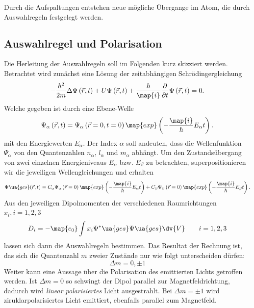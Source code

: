 Durch die Aufspaltungen entstehen neue mögliche Übergange im Atom, die durch Auswahlregeln festgelegt werden.

\subsection{Auswahlregel und Polarisation}
Die Herleitung der Auswahlregeln soll im Folgenden kurz skizziert werden.
Betrachtet wird zunächst eine Lösung der zeitabhängigen Schrödingergleichung
\begin{equation}
  \label{eq:s_gleichung}
  -\frac{\hbar^2}{2m}\Delta \Psi\left(\vec{r},t\right) + U  \Psi\left(\vec{r},t\right) + \frac{\hbar}{\map{i}} \frac{\partial}{\partial t}  \Psi\left(\vec{r},t\right)=0.
\end{equation}
Welche gegeben ist durch eine Ebene-Welle
\begin{equation*}
  \Psi_{\alpha}\left(\vec{r},t\right)=\Psi_{\alpha}\left(\vec{r}=0,t=0\right)\map{exp}\left(-\frac{\map{i}}{\hbar}E_\alpha t\right).
\end{equation*}
mit den Energiewerten $E_\alpha$. Der Index $\alpha$ soll andeuten, dass die Wellenfunktion %
$\Psi_\alpha$ von den Quantenzahlen $n_\alpha$, $l_\alpha$ und $m_\alpha$ abhängt.
Um den Zustandsübergang von zwei einzelnen Energieniveaus $E_\alpha$ bzw. $E_\beta$ zu betrachten,
superpositionieren wir die jeweiligen Wellengleichungen und erhalten %
\begin{equation*}
    \Psi\ua{ges}(\vec{r},t)=C_\alpha\Psi_{\alpha}\left(\vec{r}=0\right)\map{exp}\left(-\frac{\map{i}}{\hbar}E_\alpha t\right)+C_\beta\Psi_{\beta}\left(\vec{r}=0\right)\map{exp}\left(-\frac{\map{i}}{\hbar}E_\beta t\right).
\end{equation*}
Aus den jeweiligen Dipolmomenten der verschiedenen Raumrichtungen $x_i, i=1,2,3$
\begin{equation*}
  D_i=-\map{e_0}\int x_i \Psi^*\ua{ges}\Psi\ua{ges} \dv{V} \qquad i=1,2,3
\end{equation*}
lassen sich dann die Auswahlregeln bestimmen.
Das Resultat der Rechnung ist, das sich die Quantenzahl $m$ zweier Zustände
nur wie folgt unterscheiden dürfen:
\begin{equation}
  \label{eq:auswahlregeln}
  \Delta m=0 , \pm 1
\end{equation}
Weiter kann eine Aussage über die Polarisation des emittierten Lichts getroffen werden.
Ist $\Delta m=0$ so schwingt der Dipol parallel zur Magnetfeldrichtung, dadurch wird \emph{linear polarisiertes} Licht
ausgestrahlt. Bei $\Delta m=\pm 1$ wird ziruklarpolarisiertes Licht emittiert, ebenfalls parallel zum Magnetfeld. %
